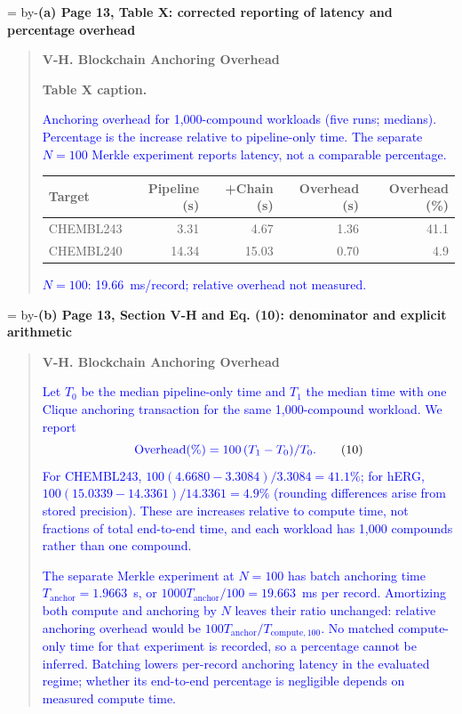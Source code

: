 \documentclass[11pt]{article}
\newenvironment{excerpt}{\begin{quote}\small\sloppy}{\end{quote}}
\newcommand{\roomfor}[1]{\par\begingroup\dimen0=\pagegoal\advance\dimen0 by-\pagetotal\ifdim\dimen0<#1\baselineskip\newpage\fi\endgroup}
\newcommand{\loc}[1]{\roomfor{7}\medskip\noindent\textbf{#1}\par\smallskip}
\newcommand{\mshead}[2]{\par\noindent\textbf{#1. #2}\par\smallskip}
\begin{document}
\loc{(a) Page 13, Table X: corrected reporting of latency and percentage overhead}
\begin{excerpt}
\mshead{V-H}{Blockchain Anchoring Overhead}
\textbf{Table X caption.}

\textcolor{blue}{Anchoring overhead for 1,000-compound
workloads (five runs; medians). Percentage is the increase
relative to pipeline-only time. The separate $N{=}100$
Merkle experiment reports latency, not a comparable percentage.}

\begin{center}
\begin{tabular}{lrrrr}
\toprule
Target & Pipeline (s) & +Chain (s) & Overhead (s) & Overhead (\%) \\
\midrule
CHEMBL243 & 3.31 & 4.67 & 1.36 & 41.1 \\
CHEMBL240 & 14.34 & 15.03 & 0.70 & 4.9 \\
\bottomrule
\end{tabular}\par\smallskip
\textcolor{blue}{$N{=}100$: 19.66~ms/record; relative overhead not measured.}
\end{center}
\end{excerpt}

\loc{(b) Page 13, Section V-H and Eq. (10): denominator and explicit arithmetic}
\begin{excerpt}
\mshead{V-H}{Blockchain Anchoring Overhead}

\textcolor{blue}{Let $T_0$ be the median pipeline-only time
and $T_1$ the median time with one Clique anchoring transaction
for the same 1,000-compound workload. We report}
\begin{equation}
\textcolor{blue}{\mathrm{Overhead}(\%)=100\,(T_1-T_0)/T_0.}
\tag{10}
\end{equation}
\textcolor{blue}{For CHEMBL243, $100(4.6680-3.3084)/3.3084
=41.1\%$; for hERG, $100(15.0339-14.3361)/14.3361
=4.9\%$ (rounding differences arise from stored precision).
These are increases relative to compute time, not fractions
of total end-to-end time, and each workload has 1,000
compounds rather than one compound.}

\textcolor{blue}{The separate Merkle experiment at $N{=}100$
has batch anchoring time $T_{\mathrm{anchor}}=1.9663$~s,
or $1000T_{\mathrm{anchor}}/100=19.663$~ms per record.
Amortizing both compute and anchoring by $N$ leaves their
ratio unchanged: relative anchoring overhead would be
$100T_{\mathrm{anchor}}/T_{\mathrm{compute},100}$.
No matched compute-only time for that experiment is recorded,
so a percentage cannot be inferred. Batching lowers per-record anchoring
latency in the evaluated regime; whether its end-to-end
percentage is negligible depends on measured compute time.}
\end{excerpt}
\end{document}

